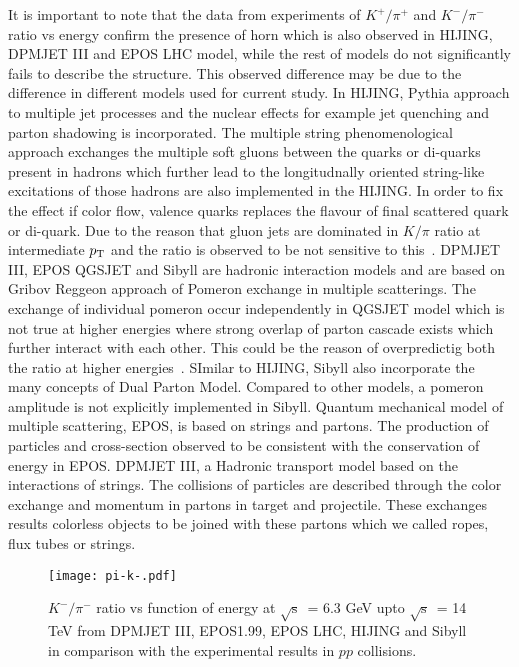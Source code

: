 \documentclass{article}
\newcommand{\sqrts}{\mbox{$\sqrt{\mathrm{s}}$}}
\newcommand{\ppt}{$p_{\rm T}$}
\begin{document}
It is important to note that the data from experiments of $K^+/\pi^+$ and $K^-/\pi^-$ ratio vs energy confirm the presence of horn which is also observed in HIJING, DPMJET III and EPOS LHC model, while the rest of models do not significantly fails to describe the structure. This observed difference may be due to the difference in different models used for current study. In HIJING, Pythia approach to multiple jet processes and the nuclear effects for example jet quenching and parton shadowing is incorporated. The  multiple string phenomenological approach exchanges the multiple soft gluons between the quarks or di-quarks present in hadrons which further lead to the longitudnally oriented string-like excitations of those hadrons are also implemented in the HIJING. In order to fix the effect if color flow, valence quarks replaces the flavour of final scattered quark or di-quark. Due to the reason that gluon jets are dominated in $K/\pi$ ratio at intermediate {\ppt} and the ratio is observed to be not sensitive to this~\cite{Sjostrand:1987su, Werner:1988yt, Wang:1991hta}. DPMJET III, EPOS QGSJET and Sibyll are hadronic interaction models and are based on Gribov Reggeon approach of Pomeron exchange in multiple scatterings. The exchange of individual pomeron occur independently in QGSJET model which is not true at higher energies where strong overlap of parton cascade exists which further interact with each other. This could be the reason of overpredictig both the ratio at higher energies~\cite{Thakuria:2012ie}. SImilar to HIJING, Sibyll also incorporate the many concepts of Dual Parton Model. Compared to other models, a pomeron amplitude is not explicitly implemented in Sibyll. Quantum mechanical model of multiple scattering, EPOS, is based on strings and partons. The production of particles and cross-section observed to be consistent with the conservation of energy in EPOS. DPMJET III, a Hadronic transport model based on the interactions of strings. The collisions of particles are described through the color exchange and momentum in partons in target and projectile. These exchanges results colorless objects to be joined with these partons which we called ropes, flux tubes or strings.     


\begin{figure}[ht!]
\begin{center}
\texttt{[image: pi-k-.pdf]}
\caption{$K^-/\pi^-$ ratio vs function of energy at \sqrts~= 6.3 GeV upto \sqrts~= 14 TeV from DPMJET III, EPOS1.99, EPOS LHC, HIJING and Sibyll in comparison with the experimental results in $pp$ collisions.}

\label{fig2}
\end{center}
\end{figure}
\end{document}

